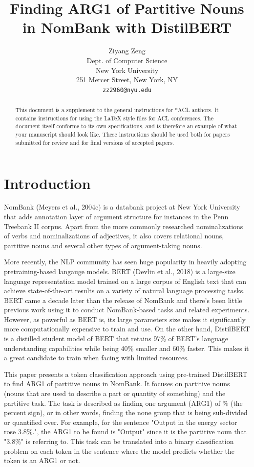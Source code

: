 \documentclass[11pt]{article}
\title{Finding ARG1 of Partitive Nouns in NomBank with DistilBERT}
\author{Ziyang Zeng \\
  Dept. of Computer Science \\
  New York University \\
  251 Mercer Street, New York, NY \\
  \texttt{zz2960@nyu.edu}}
\begin{document}
\maketitle
\begin{abstract}
  This document is a supplement to the general instructions for *ACL authors. It contains instructions for using the \LaTeX{} style files for ACL conferences.
  The document itself conforms to its own specifications, and is therefore an example of what your manuscript should look like.
  These instructions should be used both for papers submitted for review and for final versions of accepted papers.
\end{abstract}

\section{Introduction}

NomBank (Meyers et al., 2004c) is a databank project at New York University that adds annotation layer of argument structure for instances in the Penn Treebank II corpus. Apart from the more commonly researched nominalizations of verbs and nominalizations of adjectives, it also covers relational nouns, partitive nouns and several other types of argument-taking nouns.

More recently, the NLP community has seen huge popularity in heavily adopting pretraining-based langauge models. BERT (Devlin et al., 2018) is a large-size language representation model trained on a large corpus of English text that can achieve state-of-the-art results on a variety of natural language processing tasks. BERT came a decade later than the release of NomBank and there's been little previous work using it to conduct NomBank-based tasks and related experiments. However, as powerful as BERT is, its large parameters size makes it significantly more computationally expensive to train and use. On the other hand, DistilBERT is a distilled student model of BERT that retains 97\% of BERT's language understanding capabilities while being 40\% smaller and 60\% faster. This makes it a great candidate to train when facing with limited resources.

This paper presents a token classification approach using pre-trained DistilBERT to find ARG1 of partitive nouns in NomBank. It focuses on partitive nouns (nouns that are used to describe a part or quantity of something) and the partitive task. The task is described as finding one argument (ARG1) of \% (the percent sign), or in other words, finding the none group that is being sub-divided or quantified over. For example, for the sentence "Output in the energy sector rose 3.8\%.", the ARG1 to be found is "Output" since it is the partitive noun that "3.8\%" is referring to. This task can be translated into a binary classification problem on each token in the sentence where the model predicts whether the token is an ARG1 or not.
\end{document}
